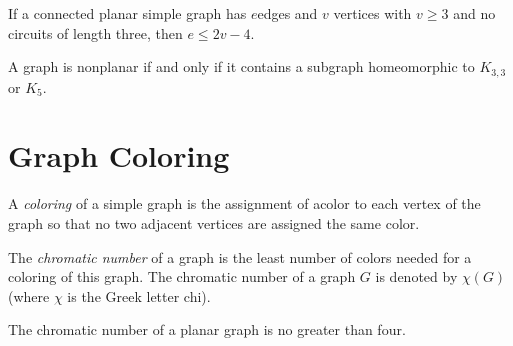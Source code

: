 \begin{corollary}
If a connected planar simple graph has $e$edges and $v$ vertices with $v \ge 3$ and no circuits of length three, then $e \le 2v - 4$.
\end{corollary}

\begin{theorem}
A graph is nonplanar if and only if it contains a subgraph homeomorphic to $K_{3,3}$ or $K_5$.
\end{theorem}

\section {Graph Coloring}
\begin{definition}
A \textit{coloring} of a simple graph is the assignment of  acolor to each vertex of the graph so that no two adjacent vertices are assigned the same color.
\end{definition}

\begin{definition}
The \textit{chromatic number} of a graph is the least number of colors needed for a coloring of this graph. The chromatic number of a graph $G$ is denoted by $\chi(G)$ (where $\chi$ is the Greek letter chi).
\end{definition}

\begin{theorem}
The chromatic number of a planar graph is no greater than four.
\end{theorem}

\newpage